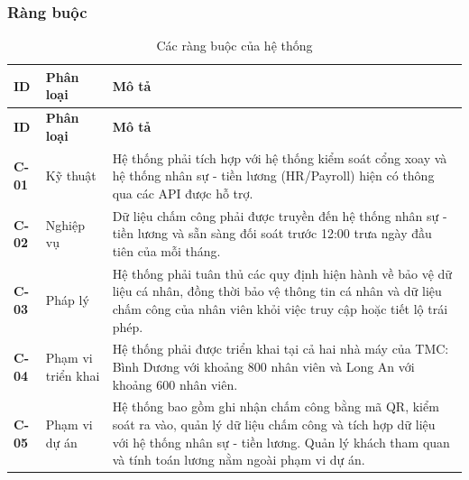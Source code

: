 \subsubsection{Ràng buộc}
\begingroup
\small
\renewcommand{\arraystretch}{1.2}
\begin{longtable}{|>{\centering\arraybackslash}m{1.3cm}|>{\raggedright\arraybackslash}m{3cm}|>{\raggedright\arraybackslash}m{11.5cm}|}
    \caption{Các ràng buộc của hệ thống}\label{tab:system-constraints}\\
    \hline
    \textbf{ID} & \textbf{Phân loại} & \textbf{Mô tả}\\
    \hline
    \endfirsthead
    \hline
    \textbf{ID} & \textbf{Phân loại} & \textbf{Mô tả}\\
    \hline
    \endhead
    \hline
    \endfoot
    \hline
    \endlastfoot
    \textbf{C-01} & Kỹ thuật & Hệ thống phải tích hợp với hệ thống kiểm soát cổng xoay và hệ thống nhân sự - tiền lương (HR/Payroll) hiện có thông qua các API được hỗ trợ.\\
    \hline
    \textbf{C-02} & Nghiệp vụ & Dữ liệu chấm công phải được truyền đến hệ thống nhân sự - tiền lương và sẵn sàng đối soát trước 12:00 trưa ngày đầu tiên của mỗi tháng.\\
    \hline
    \textbf{C-03} & Pháp lý & Hệ thống phải tuân thủ các quy định hiện hành về bảo vệ dữ liệu cá nhân, đồng thời bảo vệ thông tin cá nhân và dữ liệu chấm công của nhân viên khỏi việc truy cập hoặc tiết lộ trái phép.\\
    \hline
    \textbf{C-04} & Phạm vi triển khai & Hệ thống phải được triển khai tại cả hai nhà máy của TMC: Bình Dương với khoảng 800 nhân viên và Long An với khoảng 600 nhân viên.\\
    \hline
    \textbf{C-05} & Phạm vi dự án & Hệ thống bao gồm ghi nhận chấm công bằng mã QR, kiểm soát ra vào, quản lý dữ liệu chấm công và tích hợp dữ liệu với hệ thống nhân sự - tiền lương. Quản lý khách tham quan và tính toán lương nằm ngoài phạm vi dự án.\\
    \hline
\end{longtable}
\endgroup


